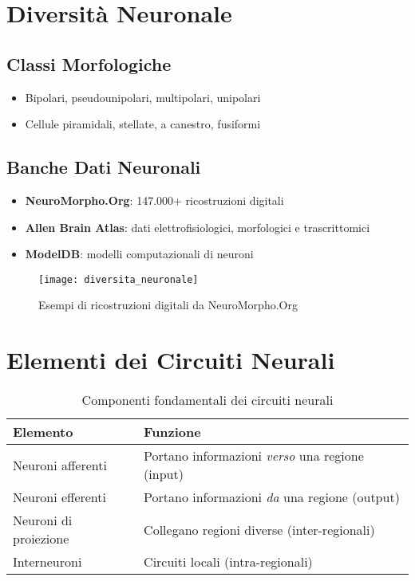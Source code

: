 \documentclass[12pt]{article}
\begin{document}
\section{Diversità Neuronale}
\subsection{Classi Morfologiche}
\begin{itemize}
    \item Bipolari, pseudounipolari, multipolari, unipolari
    \item Cellule piramidali, stellate, a canestro, fusiformi
\end{itemize}

\subsection{Banche Dati Neuronali}
\begin{itemize}
    \item \textbf{NeuroMorpho.Org}: 147.000+ ricostruzioni digitali
    \item \textbf{Allen Brain Atlas}: dati elettrofisiologici, morfologici e trascrittomici
    \item \textbf{ModelDB}: modelli computazionali di neuroni
\end{itemize}

\begin{figure}[h]
    \centering
    \texttt{[image: diversita\_neuronale]}
    \caption{Esempi di ricostruzioni digitali da NeuroMorpho.Org}
\end{figure}

\section{Elementi dei Circuiti Neurali}
\begin{table}[h]
    \centering
    \begin{tabular}{lp{8cm}}
        \toprule
        \textbf{Elemento} & \textbf{Funzione} \\
        \midrule
        Neuroni afferenti & Portano informazioni \textit{verso} una regione (input) \\
        Neuroni efferenti & Portano informazioni \textit{da} una regione (output) \\
        Neuroni di proiezione & Collegano regioni diverse (inter-regionali) \\
        Interneuroni & Circuiti locali (intra-regionali) \\
        \bottomrule
    \end{tabular}
    \caption{Componenti fondamentali dei circuiti neurali}
\end{table}
\end{document}
